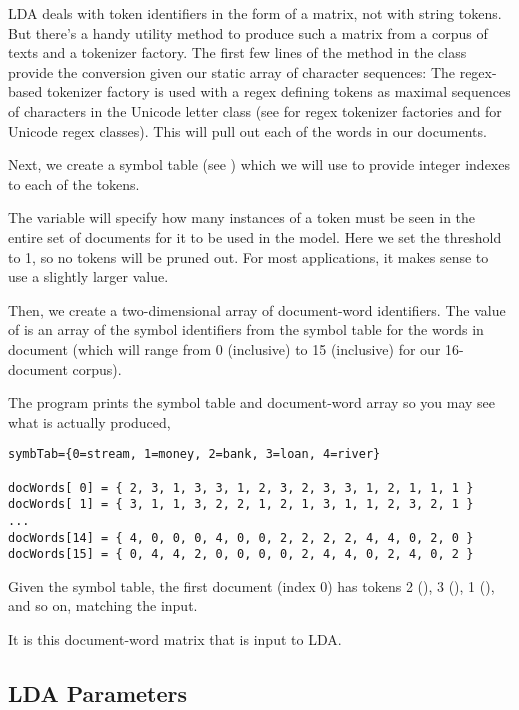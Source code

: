 LDA deals with token identifiers in the form of a matrix, not
with string tokens.  But there's a handy utility method to produce
such a matrix from a corpus of texts and a tokenizer factory.
The first few lines of the  method in
the  class provide the conversion
given our static array  of character sequences:
%
%
The regex-based tokenizer factory is used with a regex defining tokens
as maximal sequences of characters in the Unicode letter class (see
 for regex tokenizer factories and
 for Unicode regex classes).  This will
pull out each of the words in our documents.  

Next, we create a symbol table (see )
which we will use to provide integer indexes to each of the tokens.

The variable  will specify how many instances of a
token must be seen in the entire set of documents for it to be used in
the model.  Here we set the threshold to 1, so no tokens will be
pruned out.  For most applications, it makes sense to use a slightly
larger value.

Then, we create a two-dimensional array of document-word identifiers.
The value of  is an array of the symbol identifiers
from the symbol table for the words in document  (which will
range from 0 (inclusive) to 15 (inclusive) for our 16-document
corpus).  

The program prints the symbol table and document-word array so
you may see what is actually produced,
%
\begin{verbatim}
symbTab={0=stream, 1=money, 2=bank, 3=loan, 4=river}

docWords[ 0] = { 2, 3, 1, 3, 3, 1, 2, 3, 2, 3, 3, 1, 2, 1, 1, 1 }
docWords[ 1] = { 3, 1, 1, 3, 2, 2, 1, 2, 1, 3, 1, 1, 2, 3, 2, 1 }
...
docWords[14] = { 4, 0, 0, 0, 4, 0, 0, 2, 2, 2, 2, 4, 4, 0, 2, 0 }
docWords[15] = { 0, 4, 4, 2, 0, 0, 0, 0, 2, 4, 4, 0, 2, 4, 0, 2 }
\end{verbatim}
%
Given the symbol table, the first document (index 0) has tokens 2
(), 3 (), 1
(), and so on, matching the input.  

It is this document-word matrix that is input to LDA.  

\subsection{LDA Parameters}

